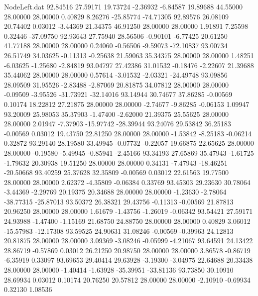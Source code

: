 \begin{filecontents}{NodeLeft.dat}
  92.84516   27.59171   19.73724    -2.36932   -6.84587   19.89688   44.55000   28.00000   28.00000    0.40829    8.26276  -25.85774  -74.71305
  92.89576   26.08109   20.74402     0.03012   -3.44369   21.34375   46.91250   28.00000   28.00000    1.91891    7.25598    0.32446  -37.09750
  92.93643   27.75940   28.56506    -0.90101   -6.77425   20.61250   41.77188   28.00000   28.00000    0.24060   -0.56506   -9.59073  -72.10837
  93.00734   26.51749   34.03625    -0.11313   -0.25638   21.59063   35.34375   28.00000   28.00000    1.48251   -6.03625   -1.25680   -2.84819
  93.04797   27.42386   31.01532    -0.18476   -2.22607   21.39688   35.44062   28.00000   28.00000    0.57614   -3.01532   -2.03321  -24.49748
  93.09856   28.09509   31.95526    -2.83488   -2.87069   20.81875   34.07812   28.00000   28.00000   -0.09509   -3.95526  -31.73921  -32.14016
  93.14944   30.74677   37.86285    -0.00569    0.10174   18.22812   27.21875   28.00000   28.00000   -2.74677   -9.86285   -0.06153    1.09947
  93.20009   25.98053   35.37903    -1.47400   -2.62000   21.39375   25.55625   28.00000   28.00000    2.01947   -7.37903  -15.97742  -28.39944
  93.24076   29.53842   36.25183    -0.00569    0.03012   19.43750   22.81250   28.00000   28.00000   -1.53842   -8.25183   -0.06214    0.32872
  93.29140   28.19580   33.49945    -0.07732   -0.22057   19.66875   22.65625   28.00000   28.00000   -0.19580   -5.49945   -0.85941   -2.45166
  93.34193   27.65869   35.47943    -1.61725   -1.79632   20.30938   19.51250   28.00000   28.00000    0.34131   -7.47943  -18.46251  -20.50668
  93.40259   25.37628   32.35809    -0.00569    0.03012   22.61563   19.77500   28.00000   28.00000    2.62372   -4.35809   -0.06384    0.33769
  93.45303   29.23630   30.78064    -3.44369   -2.29769   20.19375   20.34688   28.00000   28.00000   -1.23630   -2.78064  -38.77315  -25.87013
  93.50372   26.38321   29.43756    -0.11313   -0.00569   21.87813   20.96250   28.00000   28.00000    1.61679   -1.43756   -1.26019   -0.06342
  93.54421   27.59171   24.93988    -1.47400   -1.15169   21.68750   24.88750   28.00000   28.00000    0.40829    3.06012  -15.57983  -12.17308
  93.59525   24.90631   31.08246    -0.00569   -0.39963   24.12813   20.81875   28.00000   28.00000    3.09369   -3.08246   -0.05999   -4.21067
  93.64591   24.13422   28.86719    -0.57869    0.03012   26.21250   20.98750   28.00000   28.00000    3.86578   -0.86719   -6.35919    0.33097
  93.69653   29.40414   29.63928    -3.19300   -3.04975   22.64688   20.33438   28.00000   28.00000   -1.40414   -1.63928  -35.39951  -33.81136
  93.73850   30.10910   28.69934     0.03012    0.10174   20.76250   20.57812   28.00000   28.00000   -2.10910   -0.69934    0.32130    1.08536

\end{filecontents}
